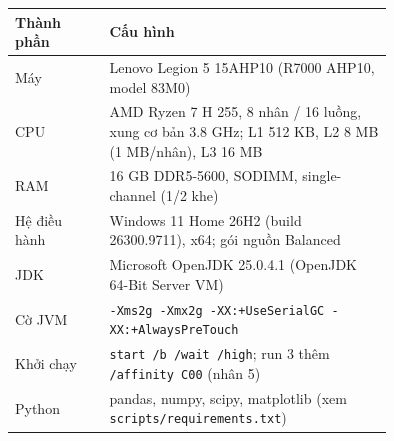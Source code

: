 \begin{tabular}{lp{0.75\linewidth}}
\toprule
Thành phần & Cấu hình \\
\midrule
Máy & Lenovo Legion 5 15AHP10 (R7000 AHP10, model 83M0) \\
CPU & AMD Ryzen 7 H 255, 8 nhân / 16 luồng, xung cơ bản 3.8 GHz; L1 512 KB, L2 8 MB (1 MB/nhân), L3 16 MB \\
RAM & 16 GB DDR5-5600, SODIMM, single-channel (1/2 khe) \\
Hệ điều hành & Windows 11 Home 26H2 (build 26300.9711), x64; gói nguồn Balanced \\
JDK & Microsoft OpenJDK 25.0.4.1 (OpenJDK 64-Bit Server VM) \\
Cờ JVM & \texttt{-Xms2g -Xmx2g -XX:+UseSerialGC -XX:+AlwaysPreTouch} \\
Khởi chạy & \texttt{start /b /wait /high}; run 3 thêm \texttt{/affinity C00} (nhân 5) \\
Python & pandas, numpy, scipy, matplotlib (xem \texttt{scripts/requirements.txt}) \\
\bottomrule
\end{tabular}
